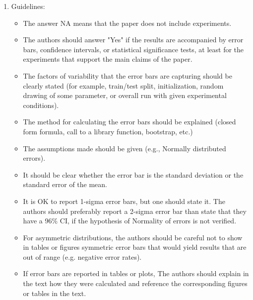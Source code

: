\documentclass{article}
\begin{document}
\begin{enumerate}
    \item[] Guidelines:
    \begin{itemize}
        \item The answer NA means that the paper does not include experiments.
        \item The authors should answer "Yes" if the results are accompanied by error bars, confidence intervals, or statistical significance tests, at least for the experiments that support the main claims of the paper.
        \item The factors of variability that the error bars are capturing should be clearly stated (for example, train/test split, initialization, random drawing of some parameter, or overall run with given experimental conditions).
        \item The method for calculating the error bars should be explained (closed form formula, call to a library function, bootstrap, etc.)
        \item The assumptions made should be given (e.g., Normally distributed errors).
        \item It should be clear whether the error bar is the standard deviation or the standard error of the mean.
        \item It is OK to report 1-sigma error bars, but one should state it. The authors should preferably report a 2-sigma error bar than state that they have a 96\% CI, if the hypothesis of Normality of errors is not verified.
        \item For asymmetric distributions, the authors should be careful not to show in tables or figures symmetric error bars that would yield results that are out of range (e.g. negative error rates).
        \item If error bars are reported in tables or plots, The authors should explain in the text how they were calculated and reference the corresponding figures or tables in the text.
    \end{itemize}


\end{enumerate}
\end{document}
